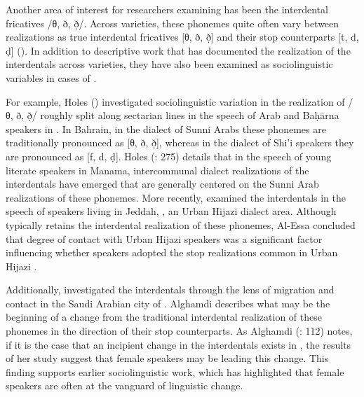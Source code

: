 \documentclass[output=paper]{langsci/langscibook}
\begin{document}
Another area of interest for researchers examining  has been the interdental fricatives /θ, ð, ð̣/. Across  varieties, these phonemes quite often vary between realizations as true interdental fricatives [θ, ð, ð̣] and their stop counterparts [t, d, ḍ] (\citealt{Al-Wer1997,Al-Wer2003daad,Al-Wer2011}). In addition to descriptive work that has documented the realization of the interdentals across  varieties, they have also been examined as sociolinguistic variables in cases of . 

  For example, Holes (\citeyear{Holes1987,Holes1995}) investigated sociolinguistic variation in the realization of /θ, ð, ð̣/ roughly split along sectarian lines in the speech of Arab and Baḥārna speakers in . In Bahrain, in the dialect of Sunni Arabs these phonemes are traditionally pronounced as [θ, ð, ð̣], whereas in the dialect of Shi’i speakers they are pronounced as [f, d, ḍ]. Holes (\citeyear{Holes1995}: 275) details that in the speech of young literate speakers in Manama, intercommunal dialect realizations of the interdentals have emerged that are generally centered on the Sunni Arab realizations of these phonemes. More recently, \citet{Al-Essa2008} examined the interdentals in the speech of   speakers living in Jeddah, , an Urban Hijazi  dialect area. Although   typically retains the interdental realization of these phonemes, Al-Essa concluded that degree of contact with Urban Hijazi speakers was a significant factor influencing whether  speakers adopted the stop realizations common in Urban Hijazi . 

Additionally, \citet{Alghamdi2014} investigated the interdentals through the lens of migration and contact in the Saudi Arabian city of . Alghamdi describes what may be the beginning of a change from the traditional interdental realization of these phonemes in the direction of their stop counterparts. As Alghamdi (\citeyear{Alghamdi2014}: 112) notes, if it is the case that an incipient change in the interdentals exists in , the results of her study suggest that female speakers may be leading this change. This finding supports earlier sociolinguistic work, which has highlighted that female speakers are often at the vanguard of linguistic change. 
\end{document}
